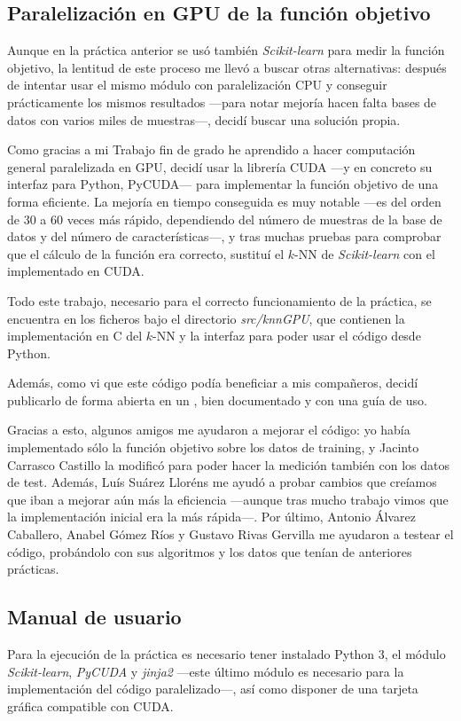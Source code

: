 \documentclass[a4paper, 11pt, titlepage]{article}
\begin{document}
    \subsection{Paralelización en GPU de la función objetivo}

    Aunque en la práctica anterior se usó también \emph{Scikit-learn} para medir la función objetivo, la lentitud de este proceso me llevó a buscar otras alternativas: después de intentar usar el mismo módulo con paralelización CPU y conseguir prácticamente los mismos resultados ---para notar mejoría hacen falta bases de datos con varios miles de muestras---, decidí buscar una solución propia.

    Como gracias a mi Trabajo fin de grado he aprendido a hacer computación general paralelizada en GPU, decidí usar la librería CUDA ---y en concreto su interfaz para Python, PyCUDA--- para implementar la función objetivo de una forma eficiente. La mejoría en tiempo conseguida es muy notable ---es del orden de 30 a 60 veces más rápido, dependiendo del número de muestras de la base de datos y del número de características---, y tras muchas pruebas para comprobar que el cálculo de la función era correcto, sustituí el $k$-NN de \emph{Scikit-learn} con el implementado en CUDA.

    Todo este trabajo, necesario para el correcto funcionamiento de la práctica, se encuentra en los ficheros bajo el directorio \emph{src/knnGPU}, que contienen la implementación en C del $k$-NN y la interfaz para poder usar el código desde Python.

    Además, como vi que este código podía beneficiar a mis compañeros, decidí publicarlo de forma abierta en un , bien documentado y con una guía de uso.

    Gracias a esto, algunos amigos me ayudaron a mejorar el código: yo había implementado sólo la función objetivo sobre los datos de training, y Jacinto Carrasco Castillo la modificó para poder hacer la medición también con los datos de test. Además, Luís Suárez Lloréns me ayudó a probar cambios que creíamos que iban a  mejorar aún más la eficiencia ---aunque tras mucho trabajo vimos que la implementación inicial era la más rápida---. Por último, Antonio Álvarez Caballero, Anabel Gómez Ríos y Gustavo Rivas Gervilla me ayudaron a testear el código, probándolo con sus algoritmos y los datos que tenían de anteriores prácticas.

    \subsection{Manual de usuario}
    Para la ejecución de la práctica es necesario tener instalado Python 3, el módulo \emph{Scikit-learn}, \emph{PyCUDA} y \emph{jinja2} ---este último módulo es necesario para la implementación del código paralelizado---, así como disponer de una tarjeta gráfica compatible con CUDA.
\end{document}
